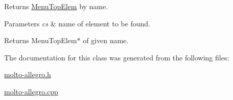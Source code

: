 Returns \hyperlink{classMenuTopElem}{Menu\-Top\-Elem} by name. 


\begin{DoxyParams}{Parameters}
{\em cs} & name of element to be found. \\
\hline
\end{DoxyParams}
\begin{DoxyReturn}{Returns}
Menu\-Top\-Elem$\ast$ of given name. 
\end{DoxyReturn}


The documentation for this class was generated from the following files\-:\begin{DoxyCompactItemize}
\item 
\hyperlink{molto-allegro_8h}{molto-\/allegro.\-h}\item 
\hyperlink{molto-allegro_8cpp}{molto-\/allegro.\-cpp}\end{DoxyCompactItemize}
